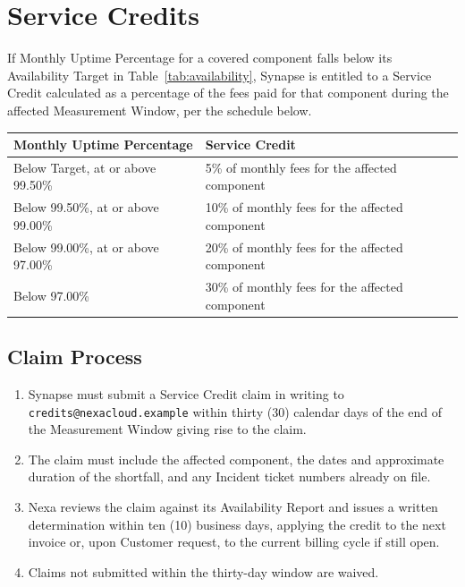 
\section{Service Credits}
\label{sec:credits}

If Monthly Uptime Percentage for a covered component falls below its Availability Target
in Table~\ref{tab:availability}, Synapse is entitled to a Service Credit calculated as a
percentage of the fees paid for that component during the affected Measurement Window,
per the schedule below.

\vspace{6pt}
\begin{tabularx}{\linewidth}{@{} L{5.6cm} X @{}}
  \toprule
  \textbf{Monthly Uptime Percentage} & \textbf{Service Credit} \\
  \midrule
  Below Target, at or above 99.50\% & 5\% of monthly fees for the affected component \\
  Below 99.50\%, at or above 99.00\% & 10\% of monthly fees for the affected component \\
  Below 99.00\%, at or above 97.00\% & 20\% of monthly fees for the affected component \\
  Below 97.00\% & 30\% of monthly fees for the affected component \\
  \bottomrule
\end{tabularx}
\label{tab:credits}

\subsection{Claim Process}

\begin{enumerate}
  \item Synapse must submit a Service Credit claim in writing to
    \texttt{credits@nexacloud.example} within thirty (30) calendar days of the end of the
    Measurement Window giving rise to the claim.
  \item The claim must include the affected component, the dates and approximate
    duration of the shortfall, and any Incident ticket numbers already on file.
  \item Nexa reviews the claim against its Availability Report and issues a written
    determination within ten (10) business days, applying the credit to the next
    invoice or, upon Customer request, to the current billing cycle if still open.
  \item Claims not submitted within the thirty-day window are waived.
\end{enumerate}

